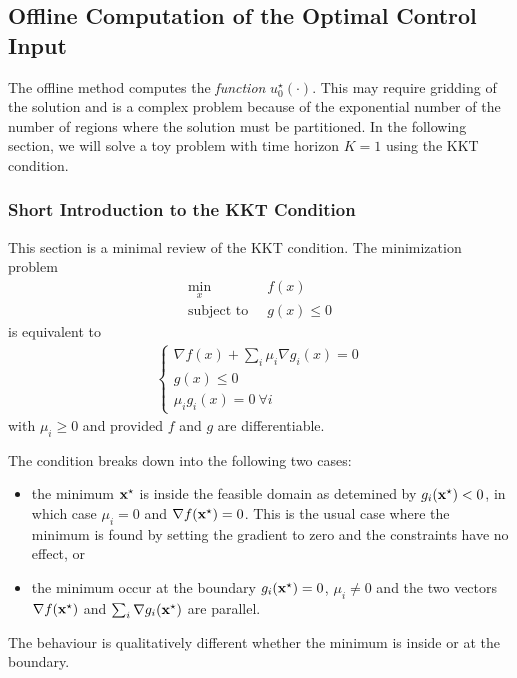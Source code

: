 \subsection{Offline Computation of the Optimal Control Input}
\label{sec:offline-computation-MPC}

The offline method computes the \emph{function} $u_0^\star(\cdot)$. This may require gridding of the solution and is a complex problem because of the exponential number of the number of regions where the solution must be partitioned. In the following section, we will solve a toy problem with time horizon $K=1$ using the KKT condition.

\subsubsection{Short Introduction to the KKT Condition}
\label{sec:short-intro-KKT}

This section is a minimal review of the KKT condition. The minimization problem
\begin{align*}
  \min_x &\ f(x) \\
  \text{subject to } &\ g(x) \le 0
\end{align*}
is equivalent to
\begin{align*}
  \begin{cases}
    \nabla f(x) + \sum_i \mu_i \nabla g_i(x) = 0 \\
    g(x) \le 0 \\
    \mu_i g_i(x) = 0\ \forall i
  \end{cases}
\end{align*}
with $\mu_i\ge 0$ and provided $f$ and $g$ are differentiable.

The condition breaks down into the following two cases:
\begin{itemize}
\item the minimum $\boldsymbol{\mathrm{x}}^\star$ is inside the feasible domain as   detemined by $g_i(\boldsymbol{\mathrm{x}}^\star) < 0$, in which case $\mu_i=0$ and   $\nabla f(\boldsymbol{\mathrm{x}}^\star) = 0$. This is the usual case where the minimum   is found by setting the gradient to zero and the constraints have no   effect, or
\item the minimum occur at the boundary $g_i(\boldsymbol{\mathrm{x}}^\star) = 0$,   $\mu_i\neq 0$ and the two vectors $\nabla f(\boldsymbol{\mathrm{x}}^\star)$ and   $\sum_i \nabla g_i(\boldsymbol{\mathrm{x}}^\star)$ are parallel.
\end{itemize}
The behaviour is qualitatively different whether the minimum is inside or at the boundary.



